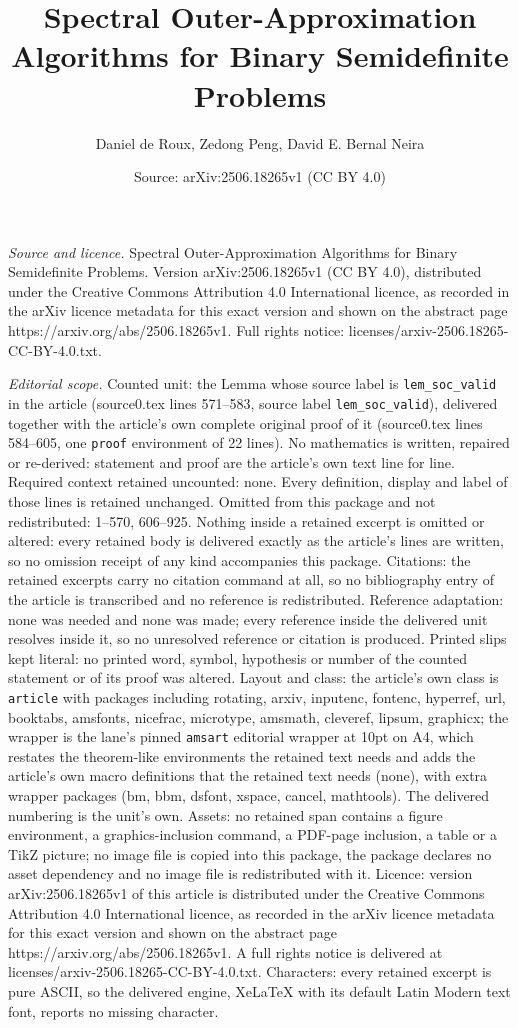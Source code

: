 \documentclass[10pt,a4paper]{amsart}
\title[Spectral Outer-Approximation Algorithms for Binary Semidefin]{Spectral Outer-Approximation Algorithms for Binary Semidefinite Problems}
\author{Daniel de Roux, Zedong Peng, David E. Bernal Neira}
\date{Source: arXiv:2506.18265v1 (CC BY 4.0)}
\begin{document}
\maketitle

\noindent\emph{Source and licence.} Spectral Outer-Approximation Algorithms for Binary Semidefinite Problems. Version arXiv:2506.18265v1 (CC BY 4.0), distributed under the Creative Commons Attribution 4.0 International licence, as recorded in the arXiv licence metadata for this exact version and shown on the abstract page https://arxiv.org/abs/2506.18265v1. Full rights notice: licenses/arxiv-2506.18265-CC-BY-4.0.txt.\par\smallskip

\noindent\textit{Editorial scope.} Counted unit: the Lemma whose source label is \texttt{lem\_soc\_valid} in the article (source0.tex lines 571--583, source label \texttt{lem\_soc\_valid}), delivered together with the article's own complete original proof of it (source0.tex lines 584--605, one \texttt{proof} environment of 22 lines). No mathematics is written, repaired or re-derived: statement and proof are the article's own text line for line. Required context retained uncounted: none. Every definition, display and label of those lines is retained unchanged. Omitted from this package and not redistributed: 1--570, 606--925. Nothing inside a retained excerpt is omitted or altered: every retained body is delivered exactly as the article's lines are written, so no omission receipt of any kind accompanies this package. Citations: the retained excerpts carry no citation command at all, so no bibliography entry of the article is transcribed and no reference is redistributed. Reference adaptation: none was needed and none was made; every reference inside the delivered unit resolves inside it, so no unresolved reference or citation is produced. Printed slips kept literal: no printed word, symbol, hypothesis or number of the counted statement or of its proof was altered. Layout and class: the article's own class is \texttt{article} with packages including rotating, arxiv, inputenc, fontenc, hyperref, url, booktabs, amsfonts, nicefrac, microtype, amsmath, cleveref, lipsum, graphicx; the wrapper is the lane's pinned \texttt{amsart} editorial wrapper at 10pt on A4, which restates the theorem-like environments the retained text needs and adds the article's own macro definitions that the retained text needs (none), with extra wrapper packages (bm, bbm, dsfont, xspace, cancel, mathtools). The delivered numbering is the unit's own. Assets: no retained span contains a figure environment, a graphics-inclusion command, a PDF-page inclusion, a table or a TikZ picture; no image file is copied into this package, the package declares no asset dependency and no image file is redistributed with it. Licence: version arXiv:2506.18265v1 of this article is distributed under the Creative Commons Attribution 4.0 International licence, as recorded in the arXiv licence metadata for this exact version and shown on the abstract page https://arxiv.org/abs/2506.18265v1. A full rights notice is delivered at licenses/arxiv-2506.18265-CC-BY-4.0.txt. Characters: every retained excerpt is pure ASCII, so the delivered engine, XeLaTeX with its default Latin Modern text font, reports no missing character.
\end{document}
